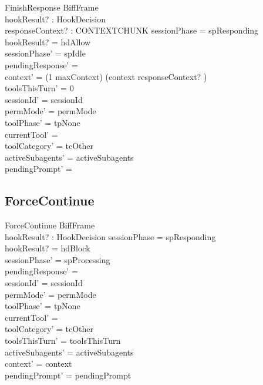 \documentclass[a4paper,10pt,fleqn]{article}
\begin{document}
\begin{schema}{FinishResponse}
  BiffFrame \\
  hookResult? : HookDecision \\
  responseContext? : CONTEXTCHUNK
  \where
  sessionPhase = spResponding \\
  hookResult? = hdAllow \\
  sessionPhase' = spIdle \\
  pendingResponse' = \emptyset \\
  context' = (1 \upto maxContext) \dres (context \cat \langle responseContext? \rangle) \\
  toolsThisTurn' = 0 \\
  sessionId' = sessionId \\
  permMode' = permMode \\
  toolPhase' = tpNone \\
  currentTool' = \emptyset \\
  toolCategory' = tcOther \\
  activeSubagents' = activeSubagents \\
  pendingPrompt' = \emptyset
\end{schema}

\subsection{ForceContinue}

\begin{schema}{ForceContinue}
  BiffFrame \\
  hookResult? : HookDecision
  \where
  sessionPhase = spResponding \\
  hookResult? = hdBlock \\
  sessionPhase' = spProcessing \\
  pendingResponse' = \emptyset \\
  sessionId' = sessionId \\
  permMode' = permMode \\
  toolPhase' = tpNone \\
  currentTool' = \emptyset \\
  toolCategory' = tcOther \\
  toolsThisTurn' = toolsThisTurn \\
  activeSubagents' = activeSubagents \\
  context' = context \\
  pendingPrompt' = pendingPrompt
\end{schema}
\end{document}
